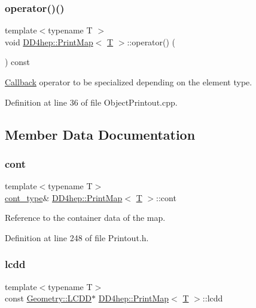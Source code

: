 \subsubsection{\texorpdfstring{operator()()}{operator()()}}
{\footnotesize\ttfamily template$<$typename T $>$ \\
void \hyperlink{struct_d_d4hep_1_1_print_map}{D\+D4hep\+::\+Print\+Map}$<$ \hyperlink{class_t}{T} $>$\+::operator() (\begin{DoxyParamCaption}{ }\end{DoxyParamCaption}) const}



\hyperlink{class_d_d4hep_1_1_callback}{Callback} operator to be specialized depending on the element type. 



Definition at line 36 of file Object\+Printout.\+cpp.



\subsection{Member Data Documentation}
\hypertarget{struct_d_d4hep_1_1_print_map_a5129907f452fc99969ce127ee6bb0f31}{}\label{struct_d_d4hep_1_1_print_map_a5129907f452fc99969ce127ee6bb0f31} 
\subsubsection{\texorpdfstring{cont}{cont}}
{\footnotesize\ttfamily template$<$typename T$>$ \\
\hyperlink{struct_d_d4hep_1_1_print_map_a75356a94ee86763170e76a2096ec4cb5}{cont\+\_\+type}\& \hyperlink{struct_d_d4hep_1_1_print_map}{D\+D4hep\+::\+Print\+Map}$<$ \hyperlink{class_t}{T} $>$\+::cont}



Reference to the container data of the map. 



Definition at line 248 of file Printout.\+h.

\hypertarget{struct_d_d4hep_1_1_print_map_a7d3f9991b68729e077b0682903d5448d}{}\label{struct_d_d4hep_1_1_print_map_a7d3f9991b68729e077b0682903d5448d} 
\subsubsection{\texorpdfstring{lcdd}{lcdd}}
{\footnotesize\ttfamily template$<$typename T$>$ \\
const \hyperlink{class_d_d4hep_1_1_geometry_1_1_l_c_d_d}{Geometry\+::\+L\+C\+DD}$\ast$ \hyperlink{struct_d_d4hep_1_1_print_map}{D\+D4hep\+::\+Print\+Map}$<$ \hyperlink{class_t}{T} $>$\+::lcdd}



